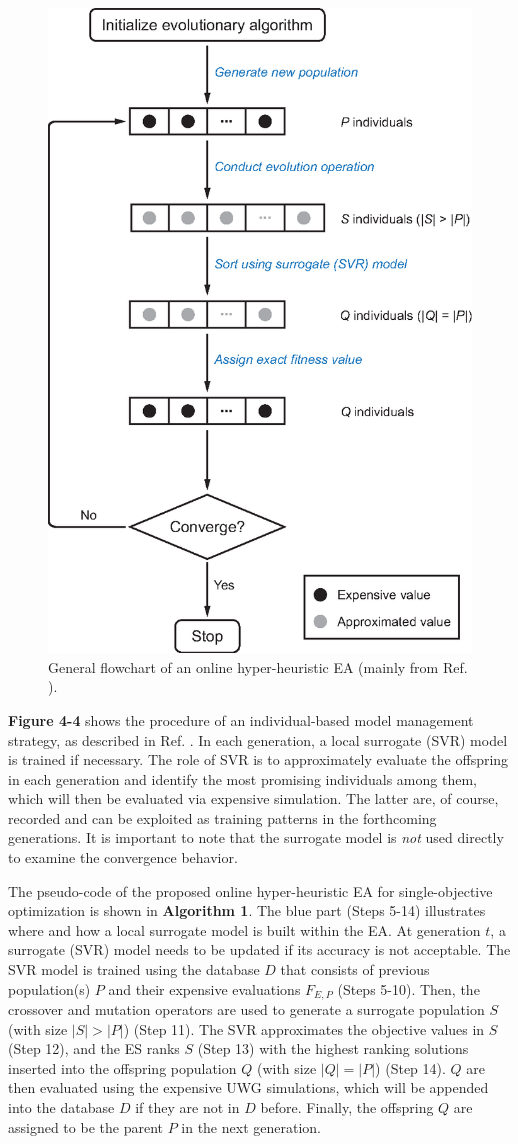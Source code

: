 \begin{figure}[h]
\centering
\includegraphics[width=.485\linewidth]{Figure4-3.eps}
\caption{General flowchart of an online hyper-heuristic EA (mainly from Ref. \cite{jin2011surrogate}).}
\end{figure}

\textbf{Figure 4-4} shows the procedure of an individual-based model management strategy, as described in Ref. \cite{jin2011surrogate}. In each generation, a local surrogate (SVR) model is trained if necessary. The role of SVR is to approximately evaluate the offspring in each generation and identify the most promising individuals among them, which will then be evaluated via expensive simulation. The latter are, of course, recorded and can be exploited as training patterns in the forthcoming generations. It is important to note that the surrogate model is \textit{not} used directly to examine the convergence behavior.

The pseudo-code of the proposed online hyper-heuristic EA for single-objective optimization is shown in \textbf{Algorithm 1}. The blue part (Steps 5-14) illustrates where and how a local surrogate model is built within the EA. At generation $t$, a surrogate (SVR) model needs to be updated if its accuracy is not acceptable. The SVR model is trained using the database $D$ that consists of previous population(s) $P$ and their expensive evaluations $F_{E,P}$ (Steps 5-10). Then, the crossover and mutation operators are used to generate a surrogate population $S$ (with size $|S| > |P|$) (Step 11). The SVR approximates the objective values in $S$ (Step 12), and the ES ranks $S$ (Step 13) with the highest ranking solutions inserted into the offspring population $Q$ (with size $|Q| = |P|$) (Step 14). $Q$ are then evaluated using the expensive UWG simulations, which will be appended into the database $D$ if they are not in $D$ before. Finally, the offspring $Q$ are assigned to be the parent $P$ in the next generation.

